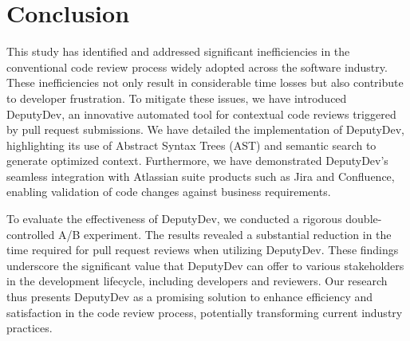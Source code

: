 \section{Conclusion}
This study has identified and addressed significant inefficiencies in the conventional code review process widely adopted across the software industry. These inefficiencies not only result in considerable time losses but also contribute to developer frustration. To mitigate these issues, we have introduced DeputyDev, an innovative automated tool for contextual code reviews triggered by pull request submissions. We have detailed the implementation of DeputyDev, highlighting its use of Abstract Syntax Trees (AST) and semantic search to generate optimized context. Furthermore, we have demonstrated DeputyDev's seamless integration with Atlassian suite products such as Jira and Confluence, enabling validation of code changes against business requirements.

To evaluate the effectiveness of DeputyDev, we conducted a rigorous double-controlled A/B experiment. The results revealed a substantial reduction in the time required for pull request reviews when utilizing DeputyDev. These findings underscore the significant value that DeputyDev can offer to various stakeholders in the development lifecycle, including developers and reviewers. Our research thus presents DeputyDev as a promising solution to enhance efficiency and satisfaction in the code review process, potentially transforming current industry practices.